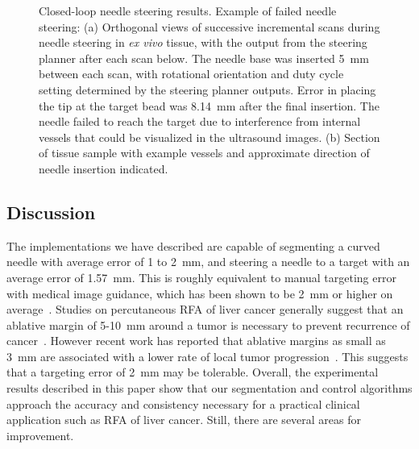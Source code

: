 \begin{figure}[!t]
\centerline{
\hfil
{}}
\caption{Closed-loop needle steering results. Example of failed needle steering: (a) Orthogonal views of successive incremental scans during needle steering in \textit{ex vivo} tissue, with the output from the steering planner after each scan below. The needle base was inserted 5~mm between each scan, with rotational orientation and duty cycle setting determined by the steering planner outputs. Error in placing the tip at the target bead was 8.14~mm after the final insertion. The needle failed to reach the target due to interference from internal vessels that could  be visualized in the ultrasound images. (b) Section of tissue sample with example vessels and approximate direction of needle insertion indicated.}
\label{fig:FailedSteering}
\end{figure}

\subsection{Discussion}
The implementations we have described are capable of segmenting a curved needle with average error of 1 to 2~mm, and steering a needle to a target with an average error of 1.57~mm. This is roughly equivalent to manual targeting error with medical image guidance, which has been shown to be 2~mm or higher on average~\cite{Crocetti2008,MaierHein2008,Schubert2013}. Studies on percutaneous RFA of liver cancer generally suggest that an ablative margin of 5-10~mm around a tumor is necessary to prevent recurrence of cancer~\cite{Dodd2001,Kim2006,Gervais2009}. However recent work has reported that ablative margins as small as 3~mm are associated with a lower rate of local tumor progression~\cite{Kim2010}. This suggests that a targeting error of 2~mm may be tolerable. Overall, the experimental results described in this paper show that our segmentation and control algorithms approach the accuracy and consistency necessary for a practical clinical application such as RFA of liver cancer. Still, there are several areas for improvement.

